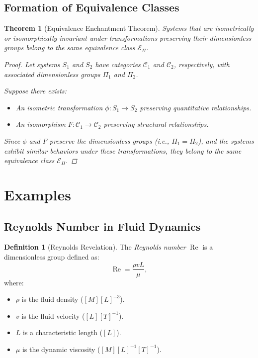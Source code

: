 \documentclass{article}
\newtheorem{theorem}{Theorem}[section]
\theoremstyle{definition}
\newtheorem{definition}{Definition}[section]
\theoremstyle{remark}
\begin{document}
	\subsection{Formation of Equivalence Classes}
	
	\begin{theorem}[Equivalence Enchantment Theorem]
		Systems that are isometrically or isomorphically invariant under transformations preserving their dimensionless groups belong to the same equivalence class $\mathcal{E}_\Pi$.
		
		\begin{proof}
			Let systems $S_1$ and $S_2$ have categories $\mathcal{C}_1$ and $\mathcal{C}_2$, respectively, with associated dimensionless groups $\Pi_1$ and $\Pi_2$.
			
			Suppose there exists:
			\begin{itemize}
				\item An isometric transformation $\phi: S_1 \rightarrow S_2$ preserving quantitative relationships.
				\item An isomorphism $F: \mathcal{C}_1 \rightarrow \mathcal{C}_2$ preserving structural relationships.
			\end{itemize}
			
			Since $\phi$ and $F$ preserve the dimensionless groups (i.e., $\Pi_1 = \Pi_2$), and the systems exhibit similar behaviors under these transformations, they belong to the same equivalence class $\mathcal{E}_\Pi$.
		\end{proof}
	\end{theorem}
	
	\section{Examples}
	
	\subsection{Reynolds Number in Fluid Dynamics}
	
	\begin{definition}[Reynolds Revelation]
		The \emph{Reynolds number} $\operatorname{Re}$ is a dimensionless group defined as:
		\[
		\operatorname{Re} = \dfrac{\rho v L}{\mu},
		\]
		where:
		\begin{itemize}
			\item $\rho$ is the fluid density ($[M][L]^{-3}$).
			\item $v$ is the fluid velocity ($[L][T]^{-1}$).
			\item $L$ is a characteristic length ($[L]$).
			\item $\mu$ is the dynamic viscosity ($[M][L]^{-1}[T]^{-1}$).
		\end{itemize}
	\end{definition}
	
\end{document}
